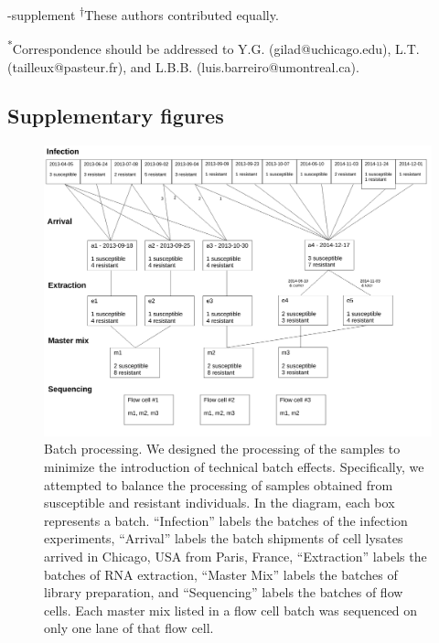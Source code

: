 \documentclass[fleqn,10pt]{wlscirep}
\begin{document}
\begin{filecontents}{\jobname-supplement}
\textsuperscript{$\dag$}These authors contributed equally.

\textsuperscript{*}Correspondence should be addressed to Y.G.
(gilad@uchicago.edu), L.T. (tailleux@pasteur.fr), and L.B.B.
(luis.barreiro@umontreal.ca).
\newpage
\subsection*{Supplementary figures}


\begin{figure}[ht]
\centering
\includegraphics[width=\linewidth]{../figure/processing.pdf}
\caption{
Batch processing. We designed the processing of the samples to
minimize the introduction of technical batch effects. Specifically, we
attempted to balance the processing of samples obtained from
susceptible and resistant individuals. In the diagram, each box
represents a batch. “Infection” labels the batches of the infection
experiments, “Arrival” labels the batch shipments of cell lysates
arrived in Chicago, USA from Paris, France, “Extraction” labels the
batches of RNA extraction, “Master Mix” labels the batches of library
preparation, and “Sequencing” labels the batches of flow cells. Each
master mix listed in a flow cell batch was sequenced on only one lane
of that flow cell.
}
\label{fig:process}
\end{figure}



\end{filecontents}
\end{document}
